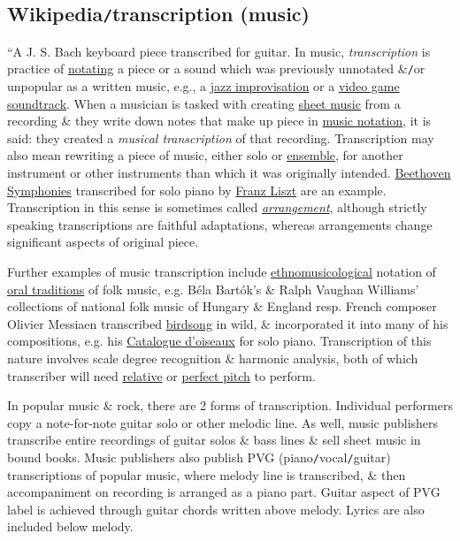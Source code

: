\documentclass{article}
\begin{document}
\subsection{Wikipedia{\tt/}transcription (music)}
``{\sf A {\sc J. S. Bach} keyboard piece transcribed for guitar.} In music, {\it transcription} is practice of \href{https://en.wikipedia.org/wiki/Musical_notation}{notating} a piece or a sound which was previously unnotated \&{\tt/}or unpopular as a written music, e.g., a \href{https://en.wikipedia.org/wiki/Jazz_improvisation}{jazz improvisation} or a \href{https://en.wikipedia.org/wiki/Video_game_soundtrack}{video game soundtrack}. When a musician is tasked with creating \href{https://en.wikipedia.org/wiki/Sheet_music}{sheet music} from a recording \& they write down notes that make up piece in \href{https://en.wikipedia.org/wiki/Music_notation}{music notation}, it is said: they created a {\it musical transcription} of that recording. Transcription may also mean rewriting a piece of music, either solo or \href{https://en.wikipedia.org/wiki/Musical_ensemble}{ensemble}, for another instrument or other instruments than which it was originally intended. \href{https://en.wikipedia.org/wiki/Beethoven_Symphonies_(Liszt)}{Beethoven Symphonies} transcribed for solo piano by \href{https://en.wikipedia.org/wiki/Franz_Liszt}{Franz Liszt} are an example. Transcription in this sense is sometimes called \href{https://en.wikipedia.org/wiki/Arrangement}{\it arrangement}, although strictly speaking transcriptions are faithful adaptations, whereas arrangements change significant aspects of original piece.

Further examples of music transcription include \href{https://en.wikipedia.org/wiki/Ethnomusicology}{ethnomusicological} notation of \href{https://en.wikipedia.org/wiki/Oral_tradition}{oral traditions} of folk music, e.g. Béla Bartók's \& Ralph Vaughan Williams' collections of national folk music of Hungary \& England resp. French composer Olivier Messiaen transcribed \href{https://en.wikipedia.org/wiki/Bird_song}{birdsong} in wild, \& incorporated it into many of his compositions, e.g. his \href{https://en.wikipedia.org/wiki/Catalogue_d%27oiseaux}{Catalogue d'oiseaux} for solo piano. Transcription of this nature involves scale degree recognition \& harmonic analysis, both of which transcriber will need \href{https://en.wikipedia.org/wiki/Relative_pitch}{relative} or \href{https://en.wikipedia.org/wiki/Perfect_pitch}{perfect pitch} to perform. 

In popular music \& rock, there are 2 forms of transcription. Individual performers copy a note-for-note guitar solo or other melodic line. As well, music publishers transcribe entire recordings of guitar solos \& bass lines \& sell sheet music in bound books. Music publishers also publish PVG (piano{\tt/}vocal{\tt/}guitar) transcriptions of popular music, where melody line is transcribed, \& then accompaniment on recording is arranged as a piano part. Guitar aspect of PVG label is achieved through guitar chords written above melody. Lyrics are also included below melody.
\end{document}
